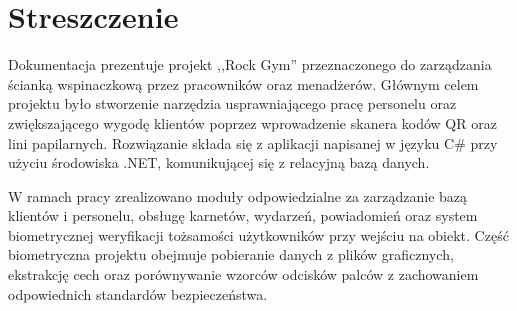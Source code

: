 \chapter*{Streszczenie}
\label{cha:streszczenie-pl}

Dokumentacja prezentuje projekt ,,Rock Gym'' przeznaczonego do zarządzania ścianką wspinaczkową przez pracowników oraz menadżerów. Głównym celem projektu było stworzenie narzędzia usprawniającego pracę personelu oraz zwiększającego wygodę klientów poprzez wprowadzenie skanera kodów QR oraz lini papilarnych. Rozwiązanie składa się z aplikacji napisanej w języku C\# przy użyciu środowiska .NET, komunikującej się z relacyjną bazą danych.

W ramach pracy zrealizowano moduły odpowiedzialne za zarządzanie bazą klientów i personelu, obsługę karnetów, wydarzeń, powiadomień oraz system biometrycznej weryfikacji tożsamości użytkowników przy wejściu na obiekt. Część biometryczna projektu obejmuje pobieranie danych z plików graficznych, ekstrakcję cech oraz porównywanie wzorców odcisków palców z zachowaniem odpowiednich standardów bezpieczeństwa.
